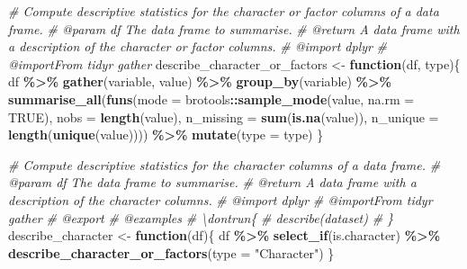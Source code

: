 \documentclass[
]{article}
\newenvironment{Shaded}{\begin{snugshade}}{\end{snugshade}}
\newcommand{\CommentTok}[1]{\textcolor[rgb]{0.56,0.35,0.01}{\textit{#1}}}
\newcommand{\ControlFlowTok}[1]{\textcolor[rgb]{0.13,0.29,0.53}{\textbf{#1}}}
\newcommand{\DataTypeTok}[1]{\textcolor[rgb]{0.13,0.29,0.53}{#1}}
\newcommand{\KeywordTok}[1]{\textcolor[rgb]{0.13,0.29,0.53}{\textbf{#1}}}
\newcommand{\NormalTok}[1]{#1}
\newcommand{\OperatorTok}[1]{\textcolor[rgb]{0.81,0.36,0.00}{\textbf{#1}}}
\newcommand{\OtherTok}[1]{\textcolor[rgb]{0.56,0.35,0.01}{#1}}
\newcommand{\StringTok}[1]{\textcolor[rgb]{0.31,0.60,0.02}{#1}}
\begin{document}
\begin{Shaded}
\begin{Highlighting}[]
\CommentTok{\#\textquotesingle{} Compute descriptive statistics for the character or factor columns of a data frame.}
\CommentTok{\#\textquotesingle{} @param df The data frame to summarise.}
\CommentTok{\#\textquotesingle{} @return A data frame with a description of the character or factor columns.}
\CommentTok{\#\textquotesingle{} @import dplyr}
\CommentTok{\#\textquotesingle{} @importFrom tidyr gather}
\NormalTok{describe\_character\_or\_factors \textless{}{-}}\StringTok{ }\ControlFlowTok{function}\NormalTok{(df, type)\{}
\NormalTok{    df }\OperatorTok{\%\textgreater{}\%}
\StringTok{        }\KeywordTok{gather}\NormalTok{(variable, value) }\OperatorTok{\%\textgreater{}\%}
\StringTok{        }\KeywordTok{group\_by}\NormalTok{(variable) }\OperatorTok{\%\textgreater{}\%}
\StringTok{        }\KeywordTok{summarise\_all}\NormalTok{(}\KeywordTok{funs}\NormalTok{(}\DataTypeTok{mode =}\NormalTok{ brotools}\OperatorTok{::}\KeywordTok{sample\_mode}\NormalTok{(value, }\DataTypeTok{na.rm =} \OtherTok{TRUE}\NormalTok{),}
                           \DataTypeTok{nobs =} \KeywordTok{length}\NormalTok{(value),}
                           \DataTypeTok{n\_missing =} \KeywordTok{sum}\NormalTok{(}\KeywordTok{is.na}\NormalTok{(value)),}
                           \DataTypeTok{n\_unique =} \KeywordTok{length}\NormalTok{(}\KeywordTok{unique}\NormalTok{(value)))) }\OperatorTok{\%\textgreater{}\%}
\StringTok{        }\KeywordTok{mutate}\NormalTok{(}\DataTypeTok{type =}\NormalTok{ type)}
\NormalTok{\}}

\CommentTok{\#\textquotesingle{} Compute descriptive statistics for the character columns of a data frame.}
\CommentTok{\#\textquotesingle{} @param df The data frame to summarise.}
\CommentTok{\#\textquotesingle{} @return A data frame with a description of the character columns.}
\CommentTok{\#\textquotesingle{} @import dplyr}
\CommentTok{\#\textquotesingle{} @importFrom tidyr gather}
\CommentTok{\#\textquotesingle{} @export}
\CommentTok{\#\textquotesingle{} @examples}
\CommentTok{\#\textquotesingle{} \textbackslash{}dontrun\{}
\CommentTok{\#\textquotesingle{} describe(dataset)}
\CommentTok{\#\textquotesingle{} \}}
\NormalTok{describe\_character \textless{}{-}}\StringTok{ }\ControlFlowTok{function}\NormalTok{(df)\{}
\NormalTok{    df }\OperatorTok{\%\textgreater{}\%}
\StringTok{        }\KeywordTok{select\_if}\NormalTok{(is.character) }\OperatorTok{\%\textgreater{}\%}
\StringTok{        }\KeywordTok{describe\_character\_or\_factors}\NormalTok{(}\DataTypeTok{type =} \StringTok{"Character"}\NormalTok{)}
\NormalTok{\}}
\end{Highlighting}
\end{Shaded}
\end{document}
